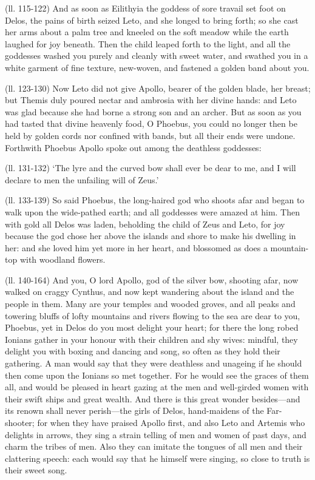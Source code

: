 (ll. 115-122) And as soon as Eilithyia the goddess of sore travail set foot on
Delos, the pains of birth seized Leto, and she longed to bring forth; so she
cast her arms about a palm tree and kneeled on the soft meadow while the earth
laughed for joy beneath. Then the child leaped forth to the light, and all the
goddesses washed you purely and cleanly with sweet water, and swathed you in a
white garment of fine texture, new-woven, and fastened a golden band about you.

(ll. 123-130) Now Leto did not give Apollo, bearer of the golden blade, her
breast; but Themis duly poured nectar and ambrosia with her divine hands: and
Leto was glad because she had borne a strong son and an archer. But as soon as
you had tasted that divine heavenly food, O Phoebus, you could no longer then
be held by golden cords nor confined with bands, but all their ends were
undone. Forthwith Phoebus Apollo spoke out among the deathless goddesses:

(ll. 131-132) ‘The lyre and the curved bow shall ever be dear to me, and
I will declare to men the unfailing will of Zeus.’

(ll. 133-139) So said Phoebus, the long-haired god who shoots afar and began to
walk upon the wide-pathed earth; and all goddesses were amazed at him. Then
with gold all Delos was laden, beholding the child of Zeus and Leto, for joy
because the god chose her above the islands and shore to make his dwelling in
her: and she loved him yet more in her heart, and blossomed as does a
mountain-top with woodland flowers.

(ll. 140-164) And you, O lord Apollo, god of the silver bow, shooting afar, now
walked on craggy Cynthus, and now kept wandering about the island and the
people in them. Many are your temples and wooded groves, and all peaks and
towering bluffs of lofty mountains and rivers flowing to the sea are dear to
you, Phoebus, yet in Delos do you most delight your heart; for there the long
robed Ionians gather in your honour with their children and shy wives: mindful,
they delight you with boxing and dancing and song, so often as they hold their
gathering. A man would say that they were deathless and unageing if he should
then come upon the Ionians so met together. For he would see the graces of them
all, and would be pleased in heart gazing at the men and well-girded women with
their swift ships and great wealth. And there is this great wonder
besides—and its renown shall never perish—the girls of Delos,
hand-maidens of the Far-shooter; for when they have praised Apollo first, and
also Leto and Artemis who delights in arrows, they sing a strain telling of men
and women of past days, and charm the tribes of men. Also they can imitate the
tongues of all men and their clattering speech: each would say that he himself
were singing, so close to truth is their sweet song.

